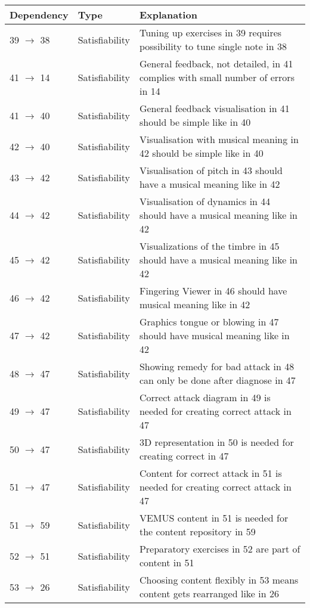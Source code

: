 \documentclass[a4paper,11pt]{article}
\begin{document}
			\begin{table}[h!]
				\begin{tabular}{l | l | p{10cm}}
					Dependency & Type & Explanation \\ \hline
					39 $\rightarrow$ 38 & Satisfiability & Tuning up exercises in 39 requires possibility to tune single note in 38 \\
					41 $\rightarrow$ 14 & Satisfiability & General feedback, not detailed, in 41 complies with small number of errors in 14 \\
					41 $\rightarrow$ 40 & Satisfiability & General feedback visualisation in 41 should be simple like in 40 \\
					42 $\rightarrow$ 40 & Satisfiability & Visualisation with musical meaning in 42 should be simple like in 40 \\
					43 $\rightarrow$ 42 & Satisfiability & Visualisation of pitch in 43 should have a musical meaning like in 42 \\
					44 $\rightarrow$ 42 & Satisfiability & Visualisation of dynamics in 44 should have a musical meaning like in 42 \\
					45 $\rightarrow$ 42 & Satisfiability & Visualizations of the timbre in 45 should have a musical meaning like in 42 \\
					46 $\rightarrow$ 42 & Satisfiability & Fingering Viewer in 46 should have musical meaning like in 42 \\
					47 $\rightarrow$ 42 & Satisfiability & Graphics tongue or blowing in 47 should have musical meaning like in 42 \\
					48 $\rightarrow$ 47 & Satisfiability & Showing remedy for bad attack in 48 can only be done after diagnose in 47 \\
					49 $\rightarrow$ 47 & Satisfiability & Correct attack diagram in 49 is needed for creating correct attack in 47 \\
					50 $\rightarrow$ 47 & Satisfiability & 3D representation in 50 is needed for creating correct in 47 \\
					51 $\rightarrow$ 47 & Satisfiability & Content for correct attack in 51 is needed for creating correct attack in 47 \\
					51 $\rightarrow$ 59 & Satisfiability & VEMUS content in 51 is needed for the content repository in 59 \\
					52 $\rightarrow$ 51 & Satisfiability & Preparatory exercises in 52 are part of content in 51 \\
					53 $\rightarrow$ 26 & Satisfiability & Choosing content flexibly in 53 means content gets rearranged like in 26 \\

\end{tabular}
\end{table}
\end{document}
